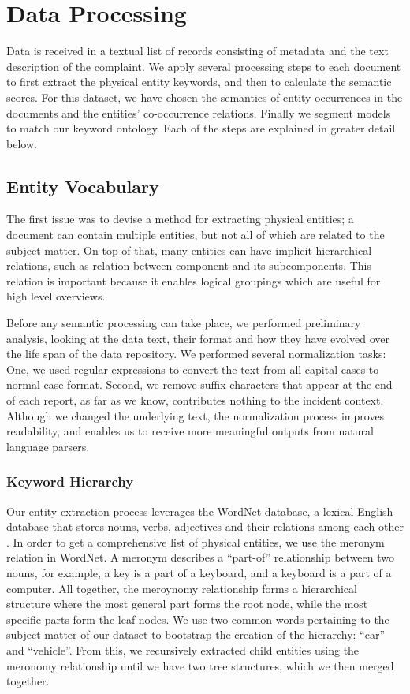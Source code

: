 \chapter{Data Processing}
Data is received in a textual list of records consisting of metadata and the
text description of the complaint. We apply several processing steps to each
document to first extract the physical entity keywords, and then to calculate
the semantic scores. For this dataset, we have chosen the semantics of
entity occurrences in the documents and the entities' co-occurrence relations. 
Finally we segment \threed models to match our keyword ontology. Each of the steps 
are explained in greater detail below.


\section{Entity Vocabulary}
The first issue was to devise a method for extracting physical entities; a
document can contain multiple entities, but not all of which are related to the 
subject matter. On top of that, many entities can have implicit hierarchical 
relations, such as relation between component and its subcomponents. This 
relation is important because it enables logical groupings which are useful for
high level overviews.

Before any semantic processing can take place, we performed
preliminary analysis, looking at the data text, their format and how they have
evolved over the life span of the data repository. We performed several
normalization tasks: One, we used regular expressions to convert the text from
all capital cases to normal case format. Second, we remove suffix characters that
appear at the end of each report, as far as we know, contributes
nothing to the incident context. Although we changed the underlying text, the
normalization process improves readability, and enables us to receive more
meaningful outputs from natural language parsers.

\subsection{Keyword Hierarchy}
Our entity extraction process leverages the WordNet database, a lexical English
database that stores nouns, verbs, adjectives and their relations among each
other \cite{WORDNET}. In order to get a comprehensive list of physical entities, we use the meronym 
relation in WordNet. A meronym describes a ``part-of'' relationship between two 
nouns, for example, a key is a part of a keyboard, and a keyboard is a part of a computer. 
All together, the meroynomy relationship forms a hierarchical 
structure where the most general part forms the root node, while the most specific 
parts form the leaf nodes. We use two common words pertaining to the subject
matter of our dataset to bootstrap the creation of the hierarchy:
``car'' and ``vehicle''. From this, we recursively extracted child entities
using the meronomy relationship until we have two tree structures, which we then
merged together.

